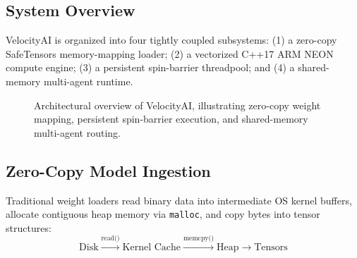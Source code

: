 \documentclass[10pt,twocolumn]{article}
\begin{document}
\subsection{System Overview}
VelocityAI is organized into four tightly coupled subsystems: (1) a zero-copy SafeTensors memory-mapping loader; (2) a vectorized C++17 ARM NEON compute engine; (3) a persistent spin-barrier threadpool; and (4) a shared-memory multi-agent runtime.

\begin{figure}[htbp]
\centering
{}
\caption{Architectural overview of VelocityAI, illustrating zero-copy weight mapping, persistent spin-barrier execution, and shared-memory multi-agent routing.}
\label{fig:arch}
\end{figure}

\subsection{Zero-Copy Model Ingestion}
Traditional weight loaders read binary data into intermediate OS kernel buffers, allocate contiguous heap memory via \texttt{malloc}, and copy bytes into tensor structures:
\begin{equation}
\text{Disk} \xrightarrow{\text{read()}} \text{Kernel Cache} \xrightarrow{\text{memcpy()}} \text{Heap} \xrightarrow{} \text{Tensors}
\end{equation}
\end{document}
